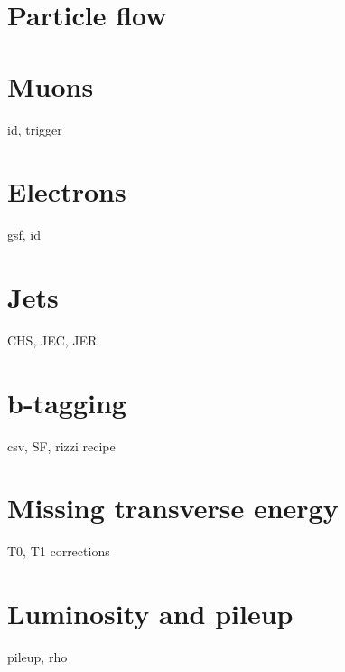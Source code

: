 \section{Particle flow}

\section{Muons}

id, trigger

\section{Electrons}
\label{sec:reconstruction-electrons}

gsf, id

\section{Jets}

CHS, JEC, JER

\section{b-tagging}

csv, SF, rizzi recipe

\section{Missing transverse energy}

T0, T1 corrections

\section{Luminosity and pileup}

pileup, rho
